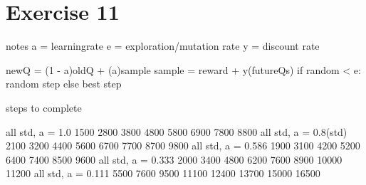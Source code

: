 \section{Exercise 11}
notes
a = learningrate
e = exploration/mutation rate
y = discount rate

newQ = (1 - a)oldQ + (a)sample
sample = reward + y(futureQs)
if random < e: random step
else best step

steps to complete

all std, a = 1.0
1500
2800
3800
4800
5800
6900
7800
8800
all std, a = 0.8(std)
2100
3200
4400
5600
6700
7700
8700
9800
all std, a = 0.586
1900
3100
4200
5200
6400
7400
8500
9600
all std, a = 0.333
2000
3400
4800
6200
7600
8900
10000
11200
all std, a = 0.111
5500
7600
9500
11100
12400
13700
15000
16500